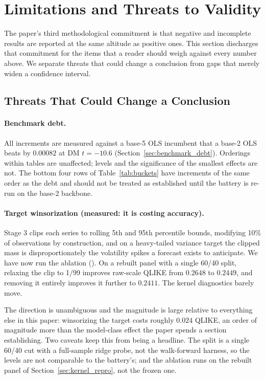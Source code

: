 \section{Limitations and Threats to Validity}
\label{sec:limitations}

The paper's third methodological commitment is that negative and incomplete
results are reported at the same altitude as positive ones. This section
discharges that commitment for the items that a reader should weigh against
every number above. We separate threats that could change a conclusion from
gaps that merely widen a confidence interval.

\subsection{Threats That Could Change a Conclusion}

\paragraph{Benchmark debt.} All increments are measured against a base-5 OLS
incumbent that a base-2 OLS beats by $0.00082$ at DM $t = -10.6$
(Section~\ref{sec:benchmark_debt}). Orderings within tables are unaffected;
levels and the significance of the smallest effects are not. The bottom four
rows of Table~\ref{tab:buckets} have increments of the same order as the debt
and should not be treated as established until the battery is re-run on the
base-2 backbone.

\paragraph{Target winsorization (measured: it is costing accuracy).} Stage 3
clips each series to rolling 5th and 95th percentile bounds, modifying 10\% of
observations by construction, and on a heavy-tailed variance target the clipped
mass is disproportionately the volatility spikes a forecast exists to
anticipate. We have now run the ablation
(). On a rebuilt panel with a single 60/40
split, relaxing the clip to 1/99 improves raw-scale QLIKE from $0.2648$ to
$0.2449$, and removing it entirely improves it further to $0.2411$. The kernel
diagnostics barely move.

The direction is unambiguous and the magnitude is large relative to everything
else in this paper: winsorizing the target costs roughly $0.024$ QLIKE, an
order of magnitude more than the model-class effect the paper spends a section
establishing. Two caveats keep this from being a headline. The split is a
single 60/40 cut with a full-sample ridge probe, not the walk-forward harness,
so the levels are not comparable to the battery's; and the ablation runs on the
rebuilt panel of Section~\ref{sec:kernel_repro}, not the frozen one.

